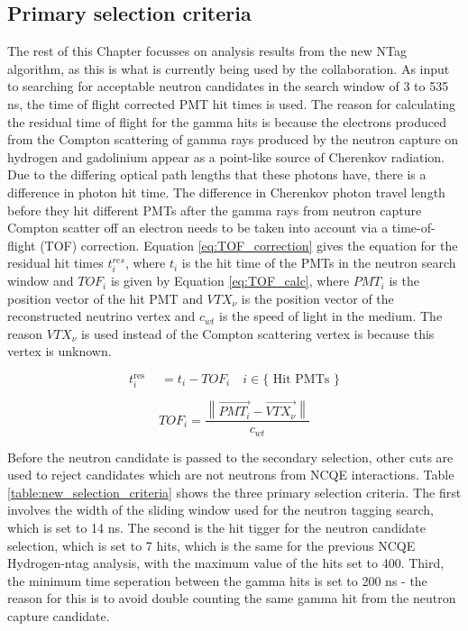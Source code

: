 \subsection{Primary selection criteria}

The rest of this Chapter focusses on analysis results from the new NTag algorithm, as this is what is currently being used by the collaboration. As input to searching for acceptable neutron candidates in the search window of 3 to 535 ns, the time of flight corrected PMT hit times is used. The reason for calculating the residual time of flight for the gamma hits is because the electrons produced from the Compton scattering of gamma rays produced by the neutron capture on hydrogen and gadolinium appear as a point-like source of Cherenkov radiation. Due to the differing optical path lengths that these photons have, there is a difference in photon hit time. The difference in Cherenkov photon travel length before they hit different PMTs  after the gamma rays from neutron capture Compton scatter off an electron needs to be taken into account via a time-of-flight (TOF) correction. Equation \ref{eq:TOF_correction} gives the equation for the residual hit times $t_{i}^{res}$, where $t_{i}$ is the hit time of the PMTs in the neutron search window and $TOF_{i}$ is given by Equation \ref{eq:TOF_calc}, where $PMT_{i}$ is the position vector of the hit PMT and $VTX_{\nu}$ is the position vector of the reconstructed neutrino vertex and $c_{wt}$ is the speed of light in the medium. The reason $VTX_{\nu}$ is used instead of the Compton scattering vertex is because this vertex is unknown. 

\begin{equation}
    t_i^{\text {res }} \quad=t_i-T O F_i \quad i \in\{\text { Hit PMTs }\}
    \label{eq:TOF_correction}
\end{equation}

\begin{equation}
T O F_i=\frac{\left\|\overrightarrow{P M T_i}-\overrightarrow{V T X_\nu}\right\|}{c_{w t}}
\label{eq:TOF_calc}
\end{equation}

Before the neutron candidate is passed to the secondary selection, other cuts are used to reject candidates which are not neutrons from NCQE interactions. Table \ref{table:new_selection_criteria} shows the three primary selection criteria. The first involves the width of the sliding window used for the neutron tagging search, which is set to 14 ns. The second is the hit tigger for the neutron candidate selection, which is set to 7 hits, which is the same for the previous NCQE Hydrogen-ntag analysis, with the maximum value of the hits set to 400. Third, the minimum time seperation between the gamma hits is set to 200 ns - the reason for this is to avoid double counting the same gamma hit from the neutron capture candidate. 


